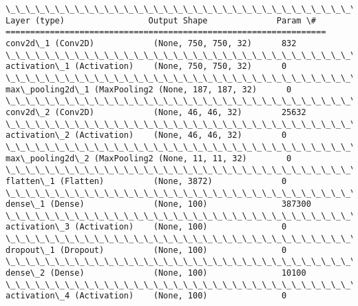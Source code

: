 \documentclass[11pt]{article}
\begin{document}
    \begin{Verbatim}[commandchars=\\\{\}]
\_\_\_\_\_\_\_\_\_\_\_\_\_\_\_\_\_\_\_\_\_\_\_\_\_\_\_\_\_\_\_\_\_\_\_\_\_\_\_\_\_\_\_\_\_\_\_\_\_\_\_\_\_\_\_\_\_\_\_\_\_\_\_\_\_
Layer (type)                 Output Shape              Param \#   
=================================================================
conv2d\_1 (Conv2D)            (None, 750, 750, 32)      832       
\_\_\_\_\_\_\_\_\_\_\_\_\_\_\_\_\_\_\_\_\_\_\_\_\_\_\_\_\_\_\_\_\_\_\_\_\_\_\_\_\_\_\_\_\_\_\_\_\_\_\_\_\_\_\_\_\_\_\_\_\_\_\_\_\_
activation\_1 (Activation)    (None, 750, 750, 32)      0         
\_\_\_\_\_\_\_\_\_\_\_\_\_\_\_\_\_\_\_\_\_\_\_\_\_\_\_\_\_\_\_\_\_\_\_\_\_\_\_\_\_\_\_\_\_\_\_\_\_\_\_\_\_\_\_\_\_\_\_\_\_\_\_\_\_
max\_pooling2d\_1 (MaxPooling2 (None, 187, 187, 32)      0         
\_\_\_\_\_\_\_\_\_\_\_\_\_\_\_\_\_\_\_\_\_\_\_\_\_\_\_\_\_\_\_\_\_\_\_\_\_\_\_\_\_\_\_\_\_\_\_\_\_\_\_\_\_\_\_\_\_\_\_\_\_\_\_\_\_
conv2d\_2 (Conv2D)            (None, 46, 46, 32)        25632     
\_\_\_\_\_\_\_\_\_\_\_\_\_\_\_\_\_\_\_\_\_\_\_\_\_\_\_\_\_\_\_\_\_\_\_\_\_\_\_\_\_\_\_\_\_\_\_\_\_\_\_\_\_\_\_\_\_\_\_\_\_\_\_\_\_
activation\_2 (Activation)    (None, 46, 46, 32)        0         
\_\_\_\_\_\_\_\_\_\_\_\_\_\_\_\_\_\_\_\_\_\_\_\_\_\_\_\_\_\_\_\_\_\_\_\_\_\_\_\_\_\_\_\_\_\_\_\_\_\_\_\_\_\_\_\_\_\_\_\_\_\_\_\_\_
max\_pooling2d\_2 (MaxPooling2 (None, 11, 11, 32)        0         
\_\_\_\_\_\_\_\_\_\_\_\_\_\_\_\_\_\_\_\_\_\_\_\_\_\_\_\_\_\_\_\_\_\_\_\_\_\_\_\_\_\_\_\_\_\_\_\_\_\_\_\_\_\_\_\_\_\_\_\_\_\_\_\_\_
flatten\_1 (Flatten)          (None, 3872)              0         
\_\_\_\_\_\_\_\_\_\_\_\_\_\_\_\_\_\_\_\_\_\_\_\_\_\_\_\_\_\_\_\_\_\_\_\_\_\_\_\_\_\_\_\_\_\_\_\_\_\_\_\_\_\_\_\_\_\_\_\_\_\_\_\_\_
dense\_1 (Dense)              (None, 100)               387300    
\_\_\_\_\_\_\_\_\_\_\_\_\_\_\_\_\_\_\_\_\_\_\_\_\_\_\_\_\_\_\_\_\_\_\_\_\_\_\_\_\_\_\_\_\_\_\_\_\_\_\_\_\_\_\_\_\_\_\_\_\_\_\_\_\_
activation\_3 (Activation)    (None, 100)               0         
\_\_\_\_\_\_\_\_\_\_\_\_\_\_\_\_\_\_\_\_\_\_\_\_\_\_\_\_\_\_\_\_\_\_\_\_\_\_\_\_\_\_\_\_\_\_\_\_\_\_\_\_\_\_\_\_\_\_\_\_\_\_\_\_\_
dropout\_1 (Dropout)          (None, 100)               0         
\_\_\_\_\_\_\_\_\_\_\_\_\_\_\_\_\_\_\_\_\_\_\_\_\_\_\_\_\_\_\_\_\_\_\_\_\_\_\_\_\_\_\_\_\_\_\_\_\_\_\_\_\_\_\_\_\_\_\_\_\_\_\_\_\_
dense\_2 (Dense)              (None, 100)               10100     
\_\_\_\_\_\_\_\_\_\_\_\_\_\_\_\_\_\_\_\_\_\_\_\_\_\_\_\_\_\_\_\_\_\_\_\_\_\_\_\_\_\_\_\_\_\_\_\_\_\_\_\_\_\_\_\_\_\_\_\_\_\_\_\_\_
activation\_4 (Activation)    (None, 100)               0         

\end{Verbatim}
\end{document}
